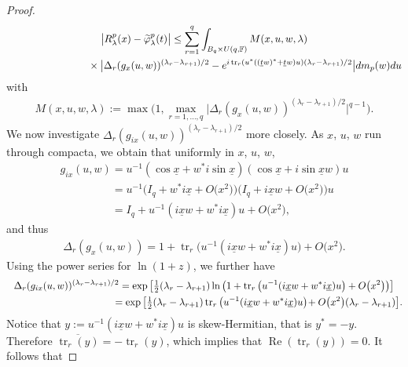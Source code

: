 \documentclass[pdftex]{sigma}
\numberwithin{equation}{section}
\DeclareMathOperator{\Ree}{Re}
\begin{document}
\begin{proof}
\begin{gather}
\big|R_{\lambda}^p(x)-\widetilde\varphi_\lambda^{p}(t)\big| \leq \sum\limits_{r=1}^q \int_{B_q\times U(q,\mathbb F)}
M(x,u,w,\lambda)
\label{main-estimate}
\\
\hphantom{\big|R_{\lambda}^p(x)-\widetilde\varphi_\lambda^{p}(t)\big| \leq}{}
\times \big| \Delta_r(g_{x}(u,w))^{(\lambda_r-\lambda_{r+1})/2}
 - e^{i \operatorname{tr}_r(u^*((\underline tw)^*+ \underline tw)u)  (\lambda_r-\lambda_{r+1})/2}\big| dm_p(w)du
\nonumber
\end{gather}
with
\begin{gather*}
M(x,u,w,\lambda):=\max \Big(1, \max_{r=1,\ldots,q}\big|\Delta_r(g_{x}(u,w))^{(\lambda_r-\lambda_{r+1})/2}\big|^{q-1}\Big).
\end{gather*}
We now investigate $\Delta_r(g_{ix}(u,w))^{(\lambda_r-\lambda_{r+1})/2}$ more closely.
As $x$, $u$, $w$ run through compacta, we obtain that uniformly in $x$, $u$, $w$,
\begin{gather*}
g_{ix}(u,w)=u^{-1}(\cos\underline x+w^*i \sin \underline x)(\cos\underline x+i\sin \underline x w)u
\\
\phantom{g_{ix}(u,w)}
=u^{-1}\big(I_q+ w^*i\underline x+O\big(x^2\big)\big) \big(I_q+i \underline x w+O\big(x^2\big)\big)u
\\
\phantom{g_{ix}(u,w)}
=I_q+ u^{-1}(i\underline x w+w^*i\underline x)u +O\big(x^2\big),
\end{gather*}
and thus
\begin{gather}
\label{entwickel}
\Delta_r(g_{x}(u,w))= 1+ \operatorname{tr}_r\big(u^{-1}(i\underline xw+w^*i\underline x)u\big)+O\big(x^2\big).
\end{gather}
Using the power series for $\ln(1+z)$, we further have
\begin{gather*}
\Delta_r(g_{ix}(u,w) )^{(\lambda_r-\lambda_{r+1})/2}=\exp\big[\tfrac 12 (\lambda_r-\lambda_{r+1})  \ln\big(1+
\operatorname{tr}_r\big(u^{-1}(i\underline xw+w^*i\underline x)u\big) +O\big(x^2\big)\big)\big]
\\
\hphantom{\Delta_r(g_{ix}(u,w) )^{(\lambda_r-\lambda_{r+1})/2}}{}
 =\exp\big[\tfrac 12(\lambda_r-\lambda_{r+1})  \operatorname{tr}_r\big(u^{-1}(i\underline xw+w^*i\underline x)u\big)\!+O\big(x^2\big) (\lambda_r-\lambda_{r+1})\big].\!
\end{gather*}
Notice that $y:= u^{-1}(i\underline xw+w^*i\underline x)u $ is skew-Hermitian, that is $y^*=-y$.
Therefore $\overline {\operatorname{tr}_r(y)}=- \operatorname{tr}_r(y)$, which implies that $\Ree(\operatorname{tr}_r(y))=0$. It follows that

\end{proof}
\end{document}
